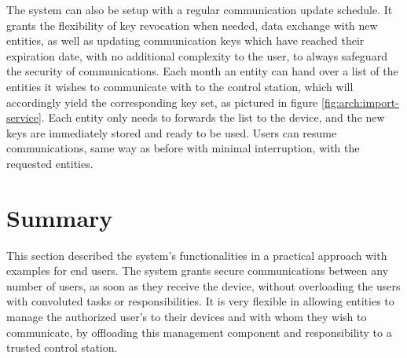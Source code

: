 
The system can also be setup with a regular communication update schedule. It grants the flexibility of key revocation when needed, data exchange with new entities, as well as updating communication keys which have reached their expiration date, with no additional complexity to the user, to always safeguard the security of communications.
Each month an entity can hand over a list of the entities it wishes to communicate with to the control station, which will accordingly yield the corresponding key set, as pictured in figure \ref{fig:arch:import-service}.
Each entity only needs to forwards the list to the device, and the new keys are immediately stored and ready to be used.
Users can resume communications, same way as before with minimal interruption, with the requested entities.




\section{Summary}\label{chap:arch:summary}

This section described the system's functionalities in a practical approach with examples for end users.
The system grants secure communications between any number of users, as soon as they receive the device, without overloading the users with convoluted tasks or responsibilities.
It is very flexible in allowing entities to manage the authorized user's to their devices and with whom they wish to communicate, by offloading this management component and responsibility to a trusted control station.
